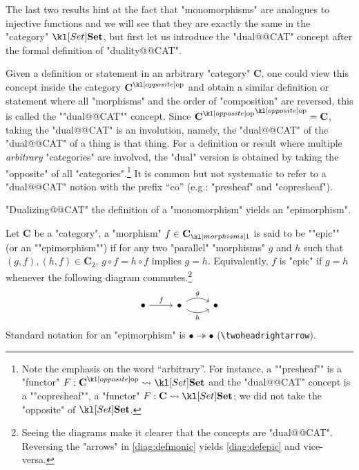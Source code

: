 \documentclass[main.tex]{subfiles}
\begin{document}
The last two results hint at the fact that "monomorphisms" are analogues to injective functions and we will see that they are exactly the same in the "category" $\catSet$, but first let us introduce the "dual@@CAT" concept after the formal definition of "duality@@CAT". 
\begin{defn}[Duality]
	Given a definition or statement in an arbitrary "category" $\mathbf{C}$, one could view this concept inside the category $\op{\mathbf{C}}$ and obtain a similar definition or statement where all "morphisms" and the order of "composition" are reversed, this is called the ""dual@@CAT"" concept. Since $\op{\op{\mathbf{C}}} = \mathbf{C}$, taking the "dual@@CAT" is an involution, namely, the "dual@@CAT" of the "dual@@CAT" of a thing is that thing. For a definition or result where multiple \emph{arbitrary} "categories" are involved, the "dual" version is obtained by taking the "opposite" of all "categories".\footnote{Note the emphasis on the word ``arbitrary''. \AP For instance, a ""presheaf"" is a "functor" $F: \op{\mathbf{C}} \rightsquigarrow \catSet$ and the "dual@@CAT" concept is a ""copresheaf"", a "functor" $F: \mathbf{C} \rightsquigarrow \catSet$; we did not take the "opposite" of $\catSet$.} It is common but not systematic to refer to a "dual@@CAT" notion with the prefix ``co'' (e.g.: "presheaf" and "copresheaf").
\end{defn}
"Dualizing@@CAT" the definition of a "monomorphism" yields an "epimorphism".
\begin{defn}[Epimorphism]
	Let $\mathbf{C}$ be a "category", a "morphism" $f \in \mor{\mathbf{C}}$ is said to be ""epic"" (or an ""epimorphism"") if for any two "parallel" "morphisms" $g$ and $h$ such that $(g,f), (h,f) \in \mathbf{C}_2$, $g\circ f = h\circ f$ implies $g = h$. Equivalently, $f$ is "epic" if $g = h$ whenever the following diagram commutes.\footnote{Seeing the diagrams make it clearer that the concepts are "dual@@CAT". Reversing the "arrows" in \eqref{diag:defmonic} yields \eqref{diag:defepic} and vice-versa.}
	\begin{equation}\label{diag:defepic}
	\begin{tikzcd}
	\bullet \arrow[r, "f"] & \bullet \arrow[r, "g", bend left] \arrow[r, "h"', bend right] & \bullet
	\end{tikzcd}
	\end{equation}
	Standard notation for an "epimorphism" is $ \bullet \twoheadrightarrow \bullet$ (\verb!\twoheadrightarrow!).
\end{defn}
\end{document}
